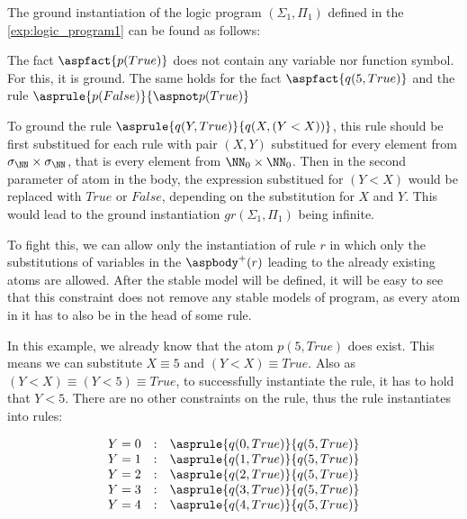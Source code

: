 \begin{example}\label{exp:grounding}
    The ground instantiation of the logic program $(\Sigma_1, \Pi_1)$ defined in the
    \cref{exp:logic_program1} can be found as follows:

    The fact $\aspfact{p(True)}$ does not contain any variable nor function symbol.
    For this, it is ground. The same holds for the fact $\aspfact{q(5, True)}$
    and the rule $\asprule{p(False)}{\aspnot p(True)}$

    To ground the rule $\asprule{q(Y, True)}{q(X, (Y < X))}$,
    this rule should be first substitued for each rule with pair $(X, Y)$ substitued
    for every element from $\sigma_\NN \times \sigma_\NN$, that is every element
    from $\NN_0\times \NN_0$. Then in the second parameter of atom in the body,
    the expression substitued for $(Y < X)$ would be replaced with $True$ or $False$,
    depending on the substitution for $X$ and $Y$. This would lead to the ground
    instantiation $gr(\Sigma_1, \Pi_1)$ being infinite.

    To fight this, we can allow only the instantiation of rule $r$ in which
    only the substitutions of variables in the $\aspbody^+(r)$
    leading to the already existing atoms are allowed.
    After the stable model will be defined,
    it will be easy to see that this constraint does not remove any
    stable models of program, as every atom in it has to also be
    in the head of some rule.

    In this example, we already know that the atom $p(5, True)$ does exist.
    This means we can substitute $X\equiv 5$ and $(Y<X)\equiv True$.
    Also as $(Y<X)\equiv (Y < 5) \equiv True$, to successfully instantiate
    the rule, it has to hold that $Y < 5$. There are no other constraints
    on the rule, thus the rule instantiates into rules:

    \begin{equation*}
        \begin{matrix}
            Y=0 & : & \asprule{q(0, True)}{q(5, True)}\\
            Y=1 & : & \asprule{q(1, True)}{q(5, True)}\\
            Y=2 & : & \asprule{q(2, True)}{q(5, True)}\\
            Y=3 & : & \asprule{q(3, True)}{q(5, True)}\\
            Y=4 & : & \asprule{q(4, True)}{q(5, True)}\\
        \end{matrix}
    \end{equation*}


\end{example}
